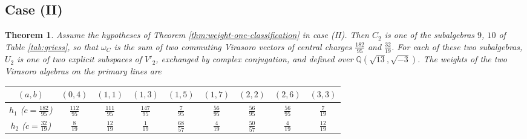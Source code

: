 \documentclass[leqno]{article}
\newtheorem{thm}{Theorem}[section]
\numberwithin{equation}{section}
\begin{document}
\subsection{Case (II)}

\begin{thm}
\label{thm:case-two-U2}
Assume the hypotheses of Theorem \ref{thm:weight-one-classification} in case (II). Then $C_2$ is one of the subalgebras $9$, $10$ of Table \ref{tab:griess}, so that $\omega_C$ is the sum of two commuting Virasoro vectors of central charges $\frac{182}{95}$ and $\frac{32}{19}$. For each of these two subalgebras, $U_2$ is one of two explicit subspaces of $V'_2$, exchanged by complex conjugation, and defined over $\mathbb{Q}(\sqrt{13},\sqrt{-3})$. The weights of the two Virasoro algebras on the primary lines are
\begin{center}
\begin{tabular}{c|cccccccc}
$(a,b)$ & $(0,4)$ & $(1,1)$ & $(1,3)$ & $(1,5)$ & $(1,7)$ & $(2,2)$ & $(2,6)$ & $(3,3)$\\
\hline
$h_1$ ($c = \frac{182}{95}$) & $\frac{112}{95}$ & $\frac{111}{95}$ & $\frac{147}{95}$ & $\frac{7}{95}$ & $\frac{56}{95}$ & $\frac{56}{95}$ & $\frac{56}{95}$ & $\frac{7}{19}$\\
$h_2$ ($c = \frac{32}{19}$) & $\frac{8}{19}$ & $\frac{12}{19}$ & $\frac{1}{19}$ & $\frac{68}{57}$ & $\frac{4}{19}$ & $\frac{50}{57}$ & $\frac{4}{19}$ & $\frac{12}{19}$
\end{tabular}
\end{center}
\end{thm}
\end{document}
